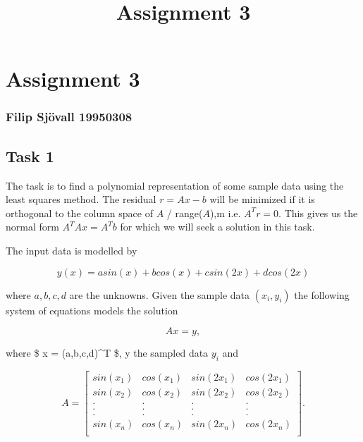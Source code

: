 \documentclass[11pt]{article}
\title{Assignment 3}
\begin{document}
    
    \maketitle
    
    

    
    \section{Assignment 3}\label{assignment-3}

\subsubsection{Filip Sjövall 19950308}\label{filip-sjuxf6vall-19950308}

    \subsection{Task 1}\label{task-1}

The task is to find a polynomial representation of some sample data
using the least squares method. The residual \(r = Ax-b\) will be
minimized if it is orthogonal to the column space of \(A\) /
range(\(A\)),m i.e. \(A^T r = 0\). This gives us the normal form
\(A^T A x = A^T b\) for which we will seek a solution in this task.

The input data is modelled by

\begin{equation}
y(x) = a sin(x) + b cos(x) + c sin(2x) + dcos(2x)
\end{equation}

where \(a,b,c,d\) are the unknowns. Given the sample data \((x_i,y_i)\)
the following system of equations models the solution

\begin{equation}
Ax = y 
\label{eq:lsq_sys}
,
\end{equation}

where \$ x = (a,b,c,d)\^{}T \$, y the sampled data \(y_i\) and

\begin{equation}
A =
\begin{bmatrix}
sin(x_1) & cos(x_1) & sin(2x_1) & cos(2x_1) \\
sin(x_2) & cos(x_2) & sin(2x_2) & cos(2x_2) \\
. & . & . & . \\
. & . & . & . \\
. & . & . & . \\
sin(x_n) & cos(x_n) & sin(2x_n) & cos(2x_n) \\
\end{bmatrix}.
\end{equation}
\end{document}
